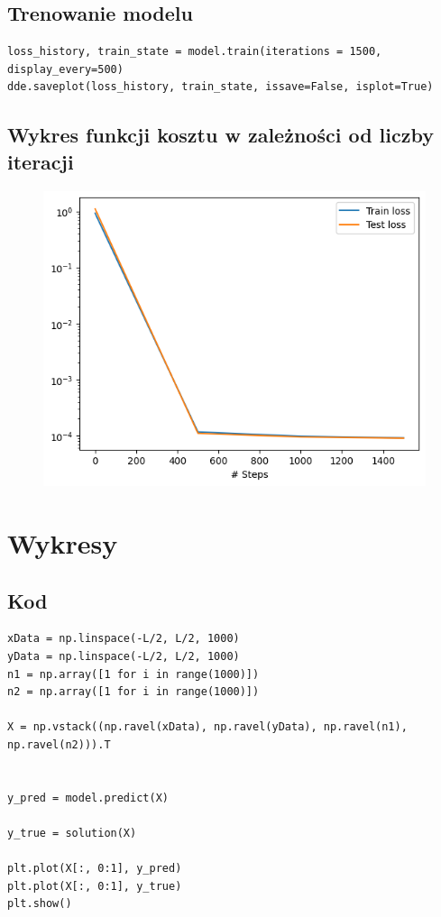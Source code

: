 \documentclass{article}
\begin{document}
	\subsection*{Trenowanie modelu}

	\begin{lstlisting}
loss_history, train_state = model.train(iterations = 1500, display_every=500)
dde.saveplot(loss_history, train_state, issave=False, isplot=True)
	\end{lstlisting}
	
	\newpage

	\subsection*{Wykres funkcji kosztu w zależności od liczby iteracji}

	\begin{figure}[h]
		\centering
		\includegraphics[scale = 0.70]{wykres1.png}
	\end{figure}
	

	\section*{Wykresy}

	\subsection*{Kod}

	\begin{lstlisting}
xData = np.linspace(-L/2, L/2, 1000)
yData = np.linspace(-L/2, L/2, 1000)
n1 = np.array([1 for i in range(1000)])
n2 = np.array([1 for i in range(1000)])
		
X = np.vstack((np.ravel(xData), np.ravel(yData), np.ravel(n1), np.ravel(n2))).T
		
		
y_pred = model.predict(X)
		
y_true = solution(X)

plt.plot(X[:, 0:1], y_pred)
plt.plot(X[:, 0:1], y_true)
plt.show()
	\end{lstlisting}
\end{document}
